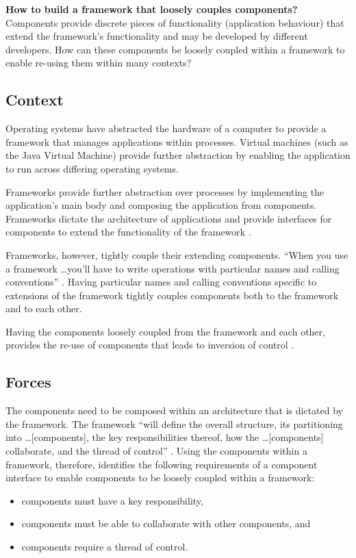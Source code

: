 \documentclass[prodmode]{style/acmlarge}
\begin{document}
\textbf{How to build a framework that loosely couples components?} Components
provide discrete pieces of functionality (application behaviour) that extend the
framework's functionality and may be developed by different developers.  How can
these components be loosely coupled within a framework to enable re-using them
within many contexts?


\subsection{Context}

Operating systems have abstracted the hardware of a computer to provide a
framework that manages applications within processes.  Virtual machines (such as
the Java Virtual Machine) provide further abstraction by enabling the
application to run across differing operating systems.

Frameworks provide further abstraction over processes by implementing the
application's main body and composing the application from components. 
Frameworks dictate the architecture of applications and provide interfaces for
components to extend the functionality of the framework \cite{gof}.

Frameworks, however, tightly couple their extending components.  ``When you use a
framework \ldots you'll have to write operations with particular names and
calling conventions'' \cite[p. 27]{gof}.  Having particular names and calling
conventions specific to extensions of the framework  tightly couples components
both to the framework and to each other.

Having the components loosely coupled from the framework and each other,
provides the re-use of components that leads to inversion of control \cite{gof}.


\subsection{Forces}

The components need to be composed within an architecture that is dictated by
the framework.  The framework ``will define the overall structure, its
partitioning into \ldots [components], the key responsibilities thereof, how the
\ldots [components] collaborate, and the thread of control'' \cite[p.26]{gof}.
Using the components within a framework, therefore, identifies the following
requirements of a component interface to enable components to be loosely coupled
within a framework:
\begin{itemize}
  \item components must have a key responsibility,
  \item components must be able to collaborate with other components, and
  \item components require a thread of control.
\end{itemize}
\end{document}
